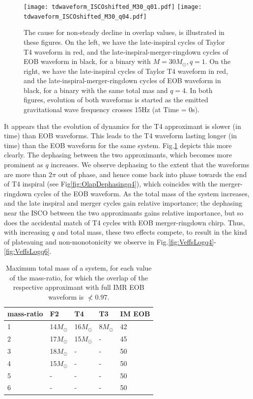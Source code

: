 \documentclass[aps,
prd,
amsmath,
amssymb,
twocolumn,
floatfix,
groupedaddress]{revtex4-1}
\begin{document}
\begin{figure}[ht]
\centerline{
\texttt{[image: tdwaveform\_ISCOshifted\_M30\_q01.pdf]}\label{fig:OlapDephasingq1}              
\texttt{[image: tdwaveform\_ISCOshifted\_M30\_q04.pdf]}\label{fig:OlapDephasingq4}
}
\caption{The cause for non-steady decline in overlap values, is illustrated in these figures. On the left, we have the late-inspiral cycles of Taylor T4 waveform in red, and the late-inspiral-merger-ringdown cycles of EOB waveform in black, for a binary with $M=30M_{\odot}, q=1$. On the right, we have the late-inspiral cycles of Taylor T4 waveform in red, and the late-inspiral-merger-ringdown cycles of EOB waveform in black, for a binary with the same total mas and $q=4$. In both figures, evolution of both waveforms is started as the emitted gravitational wave frequency crosses 15Hz (at Time = 0s). }
\label{fig:OlapDephasing}
\end{figure}

It appears that the evolution of dynamics for the T4 approximant is slower (in time) than EOB waveforms. This leads to the T4 waveform lasting longer (in time) than the EOB waveform for the same system. Fig.\ref{fig:OlapDephasing} depicts this more clearly. The dephasing between the two approximants, which becomes more prominent as $q$ increases. We observe dephasing to the extent that the waveforms are more than $2\pi$ out of phase, and hence come back into phase towards the end of T4 inspiral (see Fig\ref{fig:OlapDephasingq4}), which coincides with the merger-ringdown cycles of the EOB waveform. As the total mass of the system increases, and the late inspiral and merger cycles gain relative importance; the dephasing near the ISCO between the two approximants gains relative importance, but so does the accidental match of T4 cycles with EOB merger-ringdown chirp. Thus, with increasing $q$ and total mass, these two effects compete, to result in the kind of plateauing and non-monotonicity we observe in Fig.\ref{fig:VeffsLogq4}-\ref{fig:VeffsLogq6}.

\begin{table}[h]
\caption{\label{tab:maxTotalMassOlap} Maximum total mass of a system, for each value of the mass-ratio, for which the overlap of the respective approximant with full IMR EOB waveform is $\not< 0.97$.}
\begin{ruledtabular}
\begin{tabular}{|m{}| m{}| m{}| m{}| m{}|}
mass-ratio & F2 & T4 & T3 & IM EOB\tabularnewline \hline
1 & 14$M_{\odot}$ & 16$M_{\odot}$ & 8$M_{\odot}$ & 42\tabularnewline \hline
2 & 17$M_{\odot}$ & 15$M_{\odot}$ & - & 45\tabularnewline \hline
3 & 18$M_{\odot}$ & - & - & 50\tabularnewline \hline
4 & 15$M_{\odot}$ & - & - & 50\tabularnewline \hline
5 & - & - & - & 50\tabularnewline \hline
6 & - & - & - & 50\tabularnewline \hline
\end{tabular}
\end{ruledtabular}
\end{table}
\end{document}
